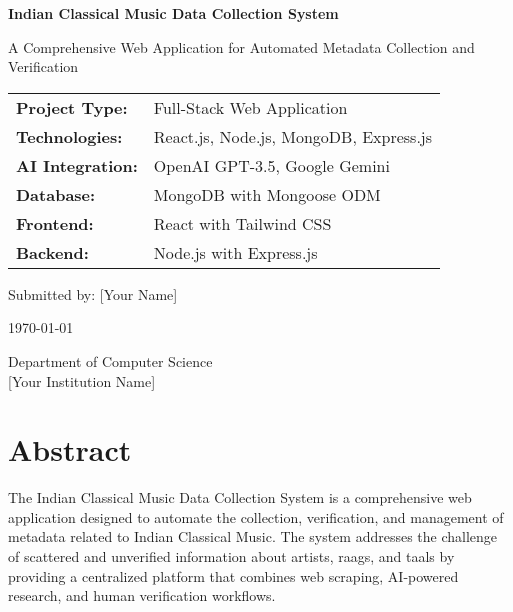 \documentclass[12pt,a4paper]{article}
\begin{document}
\begin{titlepage}
    \centering
    \vspace*{2cm}
    
    {\Huge\bfseries Indian Classical Music Data Collection System}
    
    \vspace{1cm}
    {\Large A Comprehensive Web Application for Automated Metadata Collection and Verification}
    
    \vspace{2cm}
    
    \begin{tabular}{ll}
        \textbf{Project Type:} & Full-Stack Web Application \\
        \textbf{Technologies:} & React.js, Node.js, MongoDB, Express.js \\
        \textbf{AI Integration:} & OpenAI GPT-3.5, Google Gemini \\
        \textbf{Database:} & MongoDB with Mongoose ODM \\
        \textbf{Frontend:} & React with Tailwind CSS \\
        \textbf{Backend:} & Node.js with Express.js \\
    \end{tabular}
    
    \vspace{3cm}
    
    {\large Submitted by: [Your Name]}
    
    \vspace{0.5cm}
    
    {\large \today}
    
    \vfill
    
    {\large Department of Computer Science}\\
    {\large [Your Institution Name]}
    
\end{titlepage}

\tableofcontents
\newpage

\section{Abstract}

The Indian Classical Music Data Collection System is a comprehensive web application designed to automate the collection, verification, and management of metadata related to Indian Classical Music. The system addresses the challenge of scattered and unverified information about artists, raags, and taals by providing a centralized platform that combines web scraping, AI-powered research, and human verification workflows.
\end{document}
